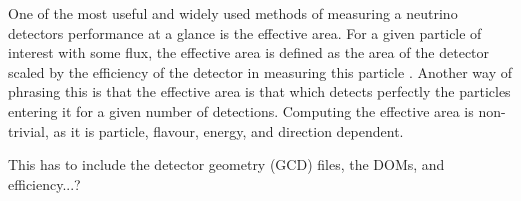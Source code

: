 One of the most useful and widely used methods of measuring a neutrino detectors performance at a glance is the effective area. For a given particle of interest with some flux, the effective area is defined as the area of the detector scaled by the efficiency of the detector in measuring this particle \cite{2010icecube}. Another way of phrasing this is that the effective area is that which detects perfectly the particles entering it for a given number of detections. Computing the effective area is non-trivial, as it is particle, flavour, energy, and direction dependent. 

This has to include the detector geometry (GCD) files, the DOMs, and efficiency...?

